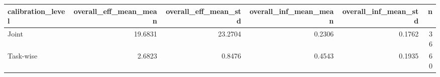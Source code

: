 \begin{tabular}{lrrrrr}
\toprule
calibration_level & overall_eff_mean_mean & overall_eff_mean_std & overall_inf_mean_mean & overall_inf_mean_std & n \\
\midrule
Joint & 19.6831 & 23.2704 & 0.2306 & 0.1762 & 36 \\
Task-wise & 2.6823 & 0.8476 & 0.4543 & 0.1935 & 60 \\
\bottomrule
\end{tabular}
